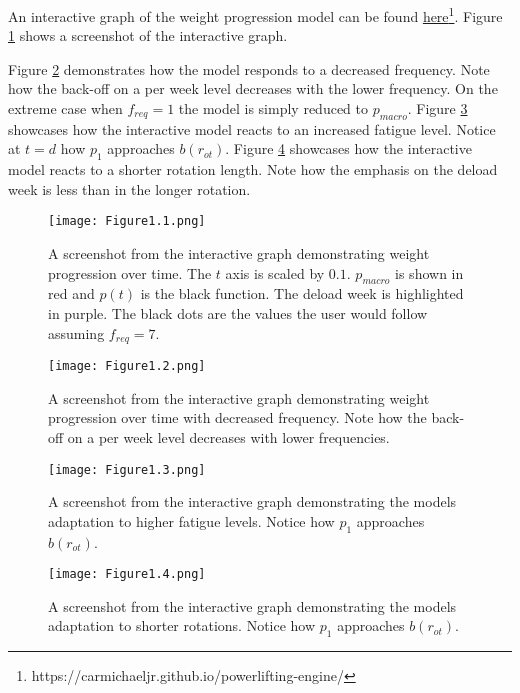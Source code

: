 An interactive graph of the weight progression model can be found \href{https://carmichaeljr.github.io/powerlifting-engine/}{here\footnote{https://carmichaeljr.github.io/powerlifting-engine/}}. Figure \ref{fig:Figure1.1} shows a screenshot of the interactive graph.

Figure \ref{fig:Figure1.2} demonstrates how the model responds to a decreased frequency. Note how the back-off on a per week level decreases with the lower frequency. On the extreme case when $f_{req}=1$ the model is simply reduced to $p_{macro}$. Figure \ref{fig:Figure1.3} showcases how the interactive model reacts to an increased fatigue level. Notice at $t=d$ how $p_1$ approaches $b(r_{ot})$. Figure \ref{fig:Figure1.4} showcases how the interactive model reacts to a shorter rotation length. Note how the emphasis on the deload week is less than in the longer rotation.

\begin{figure}[h]
    \centering
    \texttt{[image: Figure1.1.png]}
    \caption{A screenshot from the interactive graph demonstrating weight progression over time. The $t$ axis is scaled by $0.1$. $p_{macro}$ is shown in red and $p(t)$ is the black function. The deload week is highlighted in purple. The black dots are the values the user would follow assuming $f_{req}=7$.}
    \label{fig:Figure1.1}
\end{figure}
\begin{figure}[h]
    \centering
    \texttt{[image: Figure1.2.png]}
    \caption{A screenshot from the interactive graph demonstrating weight progression over time with decreased frequency. Note how the back-off on a per week level decreases with lower frequencies.}
    \label{fig:Figure1.2}
\end{figure}
\begin{figure}[h]
    \centering
    \texttt{[image: Figure1.3.png]}
    \caption{A screenshot from the interactive graph demonstrating the models adaptation to higher fatigue levels. Notice how $p_1$ approaches $b(r_{ot})$.}
    \label{fig:Figure1.3}
\end{figure}
\begin{figure}[h]
    \centering
    \texttt{[image: Figure1.4.png]}
    \caption{A screenshot from the interactive graph demonstrating the models adaptation to shorter rotations. Notice how $p_1$ approaches $b(r_{ot})$.}
    \label{fig:Figure1.4}
\end{figure}

